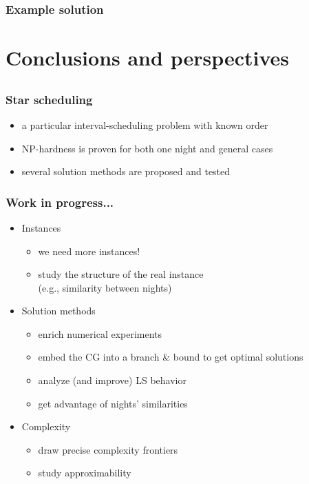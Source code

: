 \documentclass[colors]{beamer}
\begin{document}
\begin{frame}
  \frametitle{Example solution}
\end{frame}


\section[Conclusions]{Conclusions and perspectives}
\subsection{}

\begin{frame}
  \frametitle{Star scheduling}
  \begin{itemize}
  \item a particular interval-scheduling problem with known order
  \item NP-hardness is proven for both one night and general cases
  \item several solution methods are proposed and tested
  \end{itemize}
\end{frame}

\begin{frame}
  \frametitle{Work in progress...}
  \begin{itemize}

  \item Instances
    \begin{itemize}
    \item we need more instances!
    \item study the structure of the real instance \\ (e.g.,
      similarity between nights)
    \end{itemize}

    \vfill

  \item Solution methods
    \begin{itemize}
    \item enrich numerical experiments
    \item embed the CG into a branch \& bound to get optimal solutions
    \item analyze (and improve) LS behavior
    \item get advantage of nights' similarities
    \end{itemize}

    \vfill

  \item Complexity
    \begin{itemize}
    \item draw precise complexity frontiers
    \item study approximability
    \end{itemize}
  \end{itemize}

\end{frame}
\end{document}

